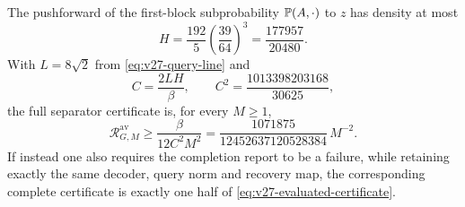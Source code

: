 \begin{proposition}
\label{prop:v27-certificate}
The pushforward of the first-block subprobability $\mathbb P(A,\cdot)$ to $z$ has density at most
\begin{equation}\label{eq:v27-H}
 H=\frac{192}{5}\left(\frac{39}{64}\right)^3
                         =\frac{177957}{20480}.
\end{equation}
With $L=8\sqrt2$ from \eqref{eq:v27-query-line} and
\[
                 C=\frac{2LH}{\beta},\qquad
                 C^2=\frac{1013398203168}{30625},
\]
the full separator certificate is, for every $M\ge1$,
\begin{equation}\label{eq:v27-evaluated-certificate}
 \mathcal R^{\mathrm{av}}_{G,M}\ge
       \frac{\beta}{12C^2M^2}
       =\frac{1071875}{12452637120528384}\,M^{-2}.
\end{equation}
If instead one also requires the completion report to be a failure, while retaining exactly the same decoder, query norm and recovery map, the corresponding complete certificate is exactly one half of \eqref{eq:v27-evaluated-certificate}.
\end{proposition}
